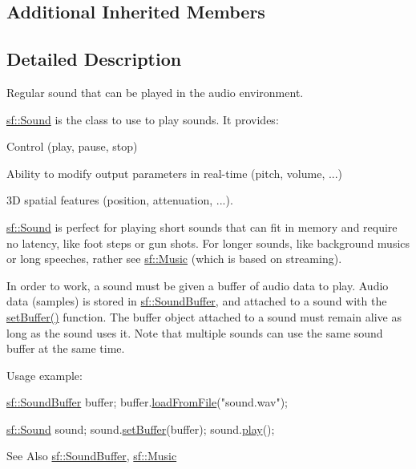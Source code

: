 \subsection*{Additional Inherited Members}


\subsection{Detailed Description}
Regular sound that can be played in the audio environment. 

\hyperlink{classsf_1_1_sound}{sf\-::\-Sound} is the class to use to play sounds. It provides\-: \begin{DoxyItemize}
\item Control (play, pause, stop) \item Ability to modify output parameters in real-\/time (pitch, volume, ...) \item 3\-D spatial features (position, attenuation, ...).\end{DoxyItemize}
\hyperlink{classsf_1_1_sound}{sf\-::\-Sound} is perfect for playing short sounds that can fit in memory and require no latency, like foot steps or gun shots. For longer sounds, like background musics or long speeches, rather see \hyperlink{classsf_1_1_music}{sf\-::\-Music} (which is based on streaming).

In order to work, a sound must be given a buffer of audio data to play. Audio data (samples) is stored in \hyperlink{classsf_1_1_sound_buffer}{sf\-::\-Sound\-Buffer}, and attached to a sound with the \hyperlink{classsf_1_1_sound_a8b395e9713d0efa48a18628c8ec1972e}{set\-Buffer()} function. The buffer object attached to a sound must remain alive as long as the sound uses it. Note that multiple sounds can use the same sound buffer at the same time.

Usage example\-: 
\begin{DoxyCode}
\hyperlink{classsf_1_1_sound_buffer}{sf::SoundBuffer} buffer;
buffer.\hyperlink{classsf_1_1_sound_buffer_a2be6a8025c97eb622a7dff6cf2594394}{loadFromFile}(\textcolor{stringliteral}{"sound.wav"});

\hyperlink{classsf_1_1_sound}{sf::Sound} sound;
sound.\hyperlink{classsf_1_1_sound_a8b395e9713d0efa48a18628c8ec1972e}{setBuffer}(buffer);
sound.\hyperlink{classsf_1_1_sound_a2953ffe632536e72e696fd880ced2532}{play}();
\end{DoxyCode}


\begin{DoxySeeAlso}{See Also}
\hyperlink{classsf_1_1_sound_buffer}{sf\-::\-Sound\-Buffer}, \hyperlink{classsf_1_1_music}{sf\-::\-Music} 
\end{DoxySeeAlso}


